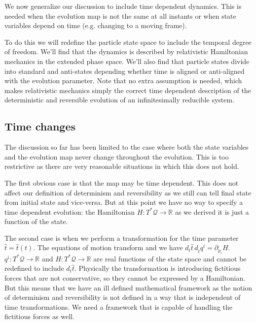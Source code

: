 \documentclass[smallextended]{svjour3}
\numberwithin{equation}{section}
\theoremstyle{definition}
\begin{document}
We now generalize our discussion to include time dependent dynamics. This is needed when the evolution map is not the same at all instants or when state variables depend on time (e.g. changing to a moving frame).

To do this we will redefine the particle state space to include the temporal degree of freedom. We'll find that the dynamics is described by relativistic Hamiltonian mechanics in the extended phase space. We'll also find that particle states divide into standard and anti-states depending whether time is aligned or anti-aligned with the evolution parameter. Note that no extra assumption is needed, which makes relativistic mechanics simply the correct time dependent description of the deterministic and reversible evolution of an infinitesimally reducible system.

\subsection{Time changes}

The discussion so far has been limited to the case where both the state variables and the evolution map never change throughout the evolution. This is too restrictive as there are very reasonable situations in which this does not hold.

The first obvious case is that the map may be time dependent. This does not affect our definition of determinism and reversibility as we still can tell final state from initial state and vice-versa. But at this point we have no way to specify a time dependent evolution: the Hamiltonian $H: T^*\mathcal{Q} \rightarrow \mathbb{R}$ as we derived it is just a function of the state.

The second case is when we perform a transformation for the time parameter $\hat{t}=\hat{t}(t)$. The equations of motion transform and we have $d_{t}\hat{t} \, d_{\hat{t}}q^i = \partial_{p_i} H$. $q^i: T^*\mathcal{Q} \rightarrow \mathbb{R}$ and $H: T^*\mathcal{Q} \rightarrow \mathbb{R}$ are real functions of the state space and cannot be redefined to include $d_{t}\hat{t}$. Physically the transformation is introducing fictitious forces that are not conservative, so they cannot be expressed by a Hamiltonian. But this means that we have an ill defined mathematical framework as the notion of determinism and reversibility is not defined in a way that is independent of time transformations. We need a framework that is capable of handling the fictitious forces as well.
\end{document}
